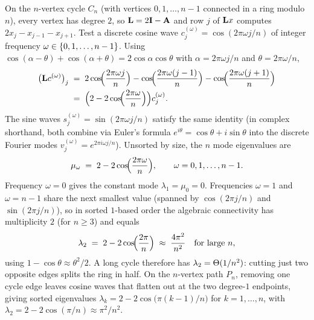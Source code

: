 \begin{example}\label{ch31:ex-path-cycle}
On the $n$-vertex cycle $C_n$ (with vertices $0,1,\dots,n-1$ connected in a ring modulo $n$), every vertex has degree $2$, so $\mathbf{L} = 2\mathbf{I} - \mathbf{A}$ and row $j$ of $\mathbf{L} x$ computes $2x_j - x_{j-1} - x_{j+1}$. Test a discrete cosine wave $c^{(\omega)}_j = \cos(2\pi \omega j/n)$ of integer frequency $\omega \in \{0,1,\dots,n-1\}$. Using $\cos(\alpha-\theta)+\cos(\alpha+\theta) = 2\cos\alpha\cos\theta$ with $\alpha = 2\pi\omega j/n$ and $\theta = 2\pi\omega/n$,
\begin{align*}
  \bigl(\mathbf{L} c^{(\omega)}\bigr)_j
  &\;=\; 2\cos\!\Bigl(\frac{2\pi\omega j}{n}\Bigr) - \cos\!\Bigl(\frac{2\pi\omega(j-1)}{n}\Bigr) - \cos\!\Bigl(\frac{2\pi\omega(j+1)}{n}\Bigr)\\
  &\;=\; \Bigl(2 - 2\cos\!\Bigl(\frac{2\pi\omega}{n}\Bigr)\Bigr) c^{(\omega)}_j .
\end{align*}
The sine waves $s^{(\omega)}_j = \sin(2\pi\omega j/n)$ satisfy the same identity (in complex shorthand, both combine via Euler's formula $e^{i\theta}=\cos\theta + i\sin\theta$ into the discrete Fourier modes $v^{(\omega)}_j = e^{2\pi i \omega j/n}$). Unsorted by size, the $n$ mode eigenvalues are
\[
  \mu_\omega \;=\; 2 - 2\cos\!\Bigl(\frac{2\pi\omega}{n}\Bigr), \qquad \omega = 0,1,\dots,n-1 .
\]
Frequency $\omega = 0$ gives the constant mode $\lambda_1 = \mu_0 = 0$. Frequencies $\omega=1$ and $\omega=n-1$ share the next smallest value (spanned by $\cos(2\pi j/n)$ and $\sin(2\pi j/n)$), so in sorted $1$-based order the algebraic connectivity has multiplicity $2$ (for $n\ge 3$) and equals
\[
  \lambda_2 \;=\; 2 - 2\cos\!\Bigl(\frac{2\pi}{n}\Bigr) \;\approx\; \frac{4\pi^2}{n^2} \quad \text{for large $n$},
\]
using $1-\cos\theta \approx \theta^2/2$. A long cycle therefore has $\lambda_2 = \Theta(1/n^2)$: cutting just two opposite edges splits the ring in half. On the $n$-vertex path $P_n$, removing one cycle edge leaves cosine waves that flatten out at the two degree-$1$ endpoints, giving sorted eigenvalues $\lambda_{k} = 2 - 2\cos\bigl(\pi(k-1)/n\bigr)$ for $k=1,\dots,n$, with $\lambda_2 = 2 - 2\cos(\pi/n) \approx \pi^2/n^2$.
\end{example}

